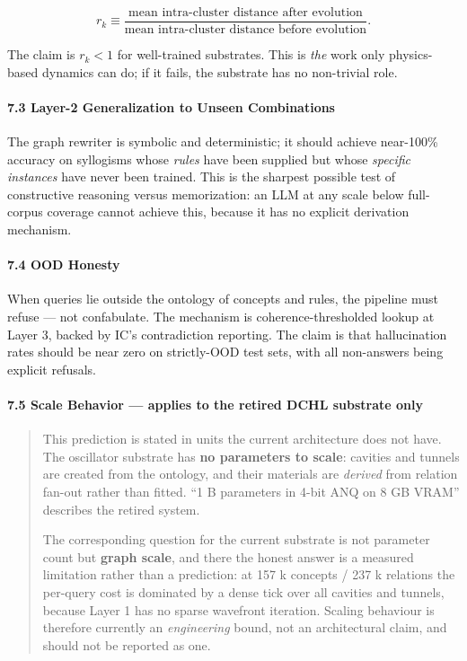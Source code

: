 \documentclass[
  11pt,
  a4paper,
]{article}
\begin{document}
\[
r_k \equiv \frac{\text{mean intra-cluster distance after evolution}}{\text{mean intra-cluster distance before evolution}}.
\]

The claim is \(r_k < 1\) for well-trained substrates. This is \emph{the}
work only physics-based dynamics can do; if it fails, the substrate has
no non-trivial role.

\paragraph{7.3 Layer-2 Generalization to Unseen
Combinations}\label{layer-2-generalization-to-unseen-combinations}

The graph rewriter is symbolic and deterministic; it should achieve
near-100\% accuracy on syllogisms whose \emph{rules} have been supplied
but whose \emph{specific instances} have never been trained. This is the
sharpest possible test of constructive reasoning versus memorization: an
LLM at any scale below full-corpus coverage cannot achieve this, because
it has no explicit derivation mechanism.

\paragraph{7.4 OOD Honesty}\label{ood-honesty}

When queries lie outside the ontology of concepts and rules, the
pipeline must refuse --- not confabulate. The mechanism is
coherence-thresholded lookup at Layer 3, backed by IC's contradiction
reporting. The claim is that hallucination rates should be near zero on
strictly-OOD test sets, with all non-answers being explicit refusals.

\paragraph{\texorpdfstring{7.5 Scale Behavior --- \textbf{applies to the
retired DCHL substrate
only}}{7.5 Scale Behavior --- applies to the retired DCHL substrate only}}\label{scale-behavior-applies-to-the-retired-dchl-substrate-only}

\begin{quote}
This prediction is stated in units the current architecture does not
have. The oscillator substrate has \textbf{no parameters to scale}:
cavities and tunnels are created from the ontology, and their materials
are \emph{derived} from relation fan-out rather than fitted. ``1 B
parameters in 4-bit ANQ on 8 GB VRAM'' describes the retired system.

The corresponding question for the current substrate is not parameter
count but \textbf{graph scale}, and there the honest answer is a
measured limitation rather than a prediction: at 157 k concepts / 237 k
relations the per-query cost is dominated by a dense tick over all
cavities and tunnels, because Layer 1 has no sparse wavefront iteration.
Scaling behaviour is therefore currently an \emph{engineering} bound,
not an architectural claim, and should not be reported as one.
\end{quote}
\end{document}
